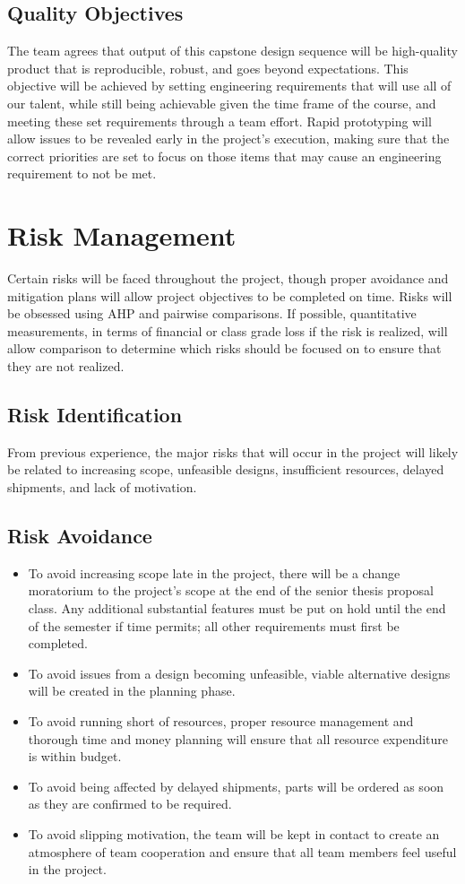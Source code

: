 \documentclass[11pt]{report}
\begin{document}
\subsection{Quality Objectives}
The team agrees that output of this capstone design sequence will be high-quality product that is reproducible, robust, and goes beyond expectations.
This objective will be achieved by setting engineering requirements that will use all of our talent, while still being achievable given the time frame of the course, and meeting these set requirements through a team effort.
Rapid prototyping will allow issues to be revealed early in the project's execution, making sure that the correct priorities are set to focus on those items that may cause an engineering requirement to not be met.

\section{Risk Management}
Certain risks will be faced throughout the project, though proper avoidance and mitigation plans will allow project objectives to be completed on time.
Risks will be obsessed using AHP and pairwise comparisons.
If possible, quantitative measurements, in terms of financial or class grade loss if the risk is realized, will allow comparison to determine which risks should be focused on to ensure that they are not realized.

\subsection{Risk Identification}
From previous experience, the major risks that will occur in the project will likely be related to increasing scope, unfeasible designs, insufficient resources, delayed shipments, and lack of motivation.

\subsection{Risk Avoidance}
\begin{itemize} \parskip2pt
	\item To avoid increasing scope late in the project, there will be a change moratorium to the project’s scope at the end of the senior thesis proposal class. Any additional substantial features must be put on hold until the end of the semester if time permits; all other requirements must first be completed.
	\item To avoid issues from a design becoming unfeasible, viable alternative designs will be created in the planning phase.
	\item To avoid running short of resources, proper resource management and thorough time and money planning will ensure that all resource expenditure is within budget.
	\item To avoid being affected by delayed shipments, parts will be ordered as soon as they are confirmed to be required.
	\item To avoid slipping motivation, the team will be kept in contact to create an atmosphere of team cooperation and ensure that all team members feel useful in the project.
\end{itemize}	
\end{document}
